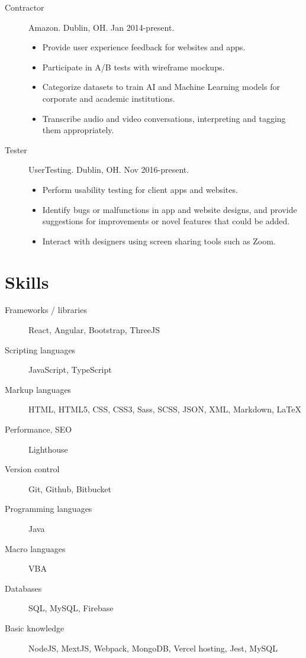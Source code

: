 \documentclass{article}
\begin{document}
\begin{description}
  \item[Contractor] Amazon. Dublin, OH. Jan 2014-present.
  \begin{itemize}
    \item Provide user experience feedback for websites and apps.
    \item Participate in A/B tests with wireframe mockups.
    \item Categorize datasets to train AI and Machine Learning models for corporate and academic institutions.
    \item Transcribe audio and video conversations, interpreting and tagging them appropriately.
  \end{itemize}
  \item[Tester] UserTesting. Dublin, OH. Nov 2016-present.
  \begin{itemize}
    \item Perform usability testing for client apps and websites.
    \item Identify bugs or malfunctions in app and website designs, and provide suggestions for improvements or novel features that could be added.
    \item Interact with designers using screen sharing tools such as Zoom.
  \end{itemize}  
\end{description}

\section{Skills}

\begin{description}
  \item [Frameworks / libraries] React, Angular, Bootstrap, ThreeJS
  \item [Scripting languages] JavaScript, TypeScript
  \item [Markup languages] HTML, HTML5, CSS, CSS3, Sass, SCSS, JSON, XML, Markdown, LaTeX
  \item [Performance, SEO] Lighthouse
  \item [Version control] Git, Github, Bitbucket
  \item [Programming languages] Java
  \item [Macro languages] VBA
  \item [Databases] SQL, MySQL, Firebase
  \item [Basic knowledge] NodeJS, MextJS, Webpack, MongoDB, Vercel hosting, Jest, MySQL
\end{description}
\end{document}
